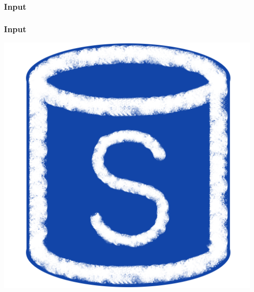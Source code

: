 \begin{frame}
      \frametitle{Input}
      \centering
      \vspace*{0.2cm}
      
  \end{frame}


\begin{frame}
      \frametitle{Input}
      \centering
      \vspace*{0.2cm}
      \includegraphics[scale=0.35]{images/sa.png}
  \end{frame}

